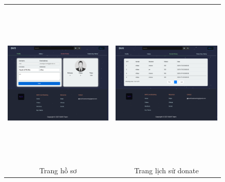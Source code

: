 \begin{center}
\begin{figure}[H]
\begin{tabular}{cc}
  \includegraphics[width=8.5cm,height=8cm]{./imgs/layouts/profile} &   \includegraphics[width=8.5cm,height=8cm]{./imgs/layouts/history_donate} \\
Trang hồ sơ & Trang lịch sử donate \\[6pt]
\end{tabular}
\end{figure}
\end{center}

